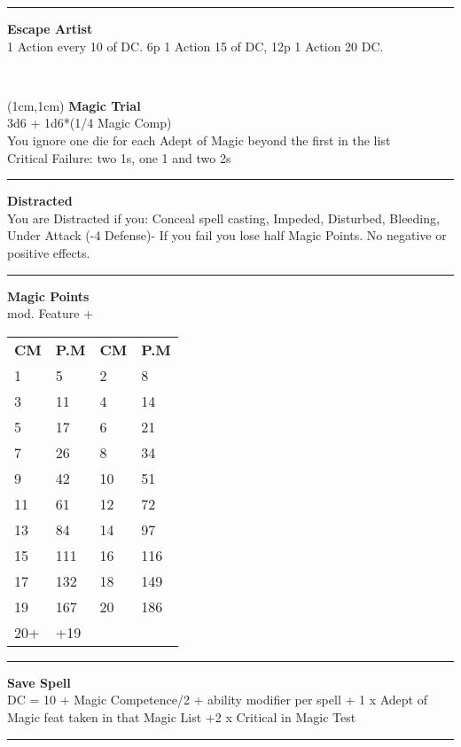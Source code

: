 \documentclass[a4paper,12 pt,openany]{book}
\newcommand{\linex}{\rule{\textwidth}{0.4pt}}
\begin{document}
\begin{textblock*}{7cm}
\linex

\textbf{Escape Artist}\\
1 Action every 10 of DC. 6p 1 Action 15 of DC, 12p 1 Action 20 DC.

\end{textblock*}

~\newpage

\begin{textblock*}{5cm}(1cm,1cm) %
\textbf{Magic Trial}\\
3d6 + 1d6*(1/4 Magic Comp)\\
You ignore one die for each Adept of Magic beyond the first in the list\\
Critical Failure: two 1s, one 1 and two 2s\\


\linex

\textbf{Distracted}\\
You are Distracted if you: Conceal spell casting, Impeded, Disturbed, Bleeding, Under Attack (-4 Defense)-
If you fail you lose half Magic Points. No negative or positive effects.\\

\linex

\textbf{Magic Points}\\
mod. Feature + \\

\begin{tabular}{ll|ll}
\textbf{CM} & \textbf{P.M}& \textbf{CM} & \textbf{P.M}\\
1&5 &2&8 \\
3&11&4&14\\
5&17&6&21\\
7&26&8&34\\
9&42&10&51\\
11&61&12&72\\
13&84&14&97\\
15&111&16&116\\
17&132&18&149\\
19&167&20&186\\
20+&+19&&\\
\end{tabular}

\linex

\textbf{Save Spell}\\
DC = 10 + Magic Competence/2 + ability modifier per spell + 1 x Adept of Magic feat taken in that Magic List +2 x Critical in Magic Test

\linex


\end{textblock*}
\end{document}
